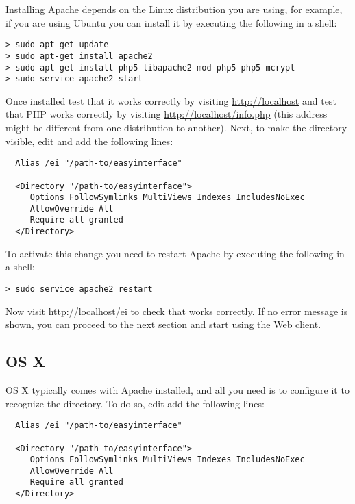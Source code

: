 Installing Apache depends on the Linux distribution you are using, for
example, if you are using Ubuntu you can install it by executing the
following in a shell:

\medskip
\begin{lstlisting}
> sudo apt-get update
> sudo apt-get install apache2
> sudo apt-get install php5 libapache2-mod-php5 php5-mcrypt
> sudo service apache2 start
\end{lstlisting}

\medskip
\noindent
Once installed test that it works correctly by visiting
\url{http://localhost} and test that PHP works correctly by visiting
\url{http://localhost/info.php} (this address might be different from
one distribution to another). Next, to make the 
directory visible, edit 
and add the following lines:

\medskip
\begin{lstlisting}
  Alias /ei "/path-to/easyinterface"

  <Directory "/path-to/easyinterface">
     Options FollowSymlinks MultiViews Indexes IncludesNoExec
     AllowOverride All
     Require all granted
  </Directory>
\end{lstlisting}
\medskip
\noindent
To activate this change you need to restart Apache by executing the
following in a shell:
\medskip
\begin{lstlisting}
> sudo service apache2 restart
\end{lstlisting}

\medskip
\noindent
Now visit \url{http://localhost/ei} to check that \ei works
correctly. If no error message is shown, you can proceed to the next
section and start using the Web client.

\subsection{OS X}\label{ch:installation:installing-server:os-x}

OS X typically comes with Apache installed, and all you need is to
configure it to recognize the  directory. To do
so, edit  add the following lines:

\medskip
\begin{lstlisting}
  Alias /ei "/path-to/easyinterface"

  <Directory "/path-to/easyinterface">
     Options FollowSymlinks MultiViews Indexes IncludesNoExec
     AllowOverride All
     Require all granted
  </Directory>
\end{lstlisting}

